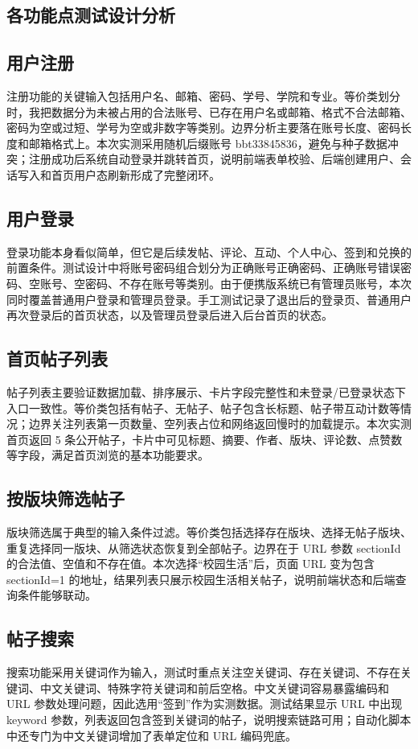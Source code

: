 \documentclass[bwprint]{report}
\begin{document}
\subsection{各功能点测试设计分析}
\subsection{用户注册}
注册功能的关键输入包括用户名、邮箱、密码、学号、学院和专业。等价类划分时，我把数据分为未被占用的合法账号、已存在用户名或邮箱、格式不合法邮箱、密码为空或过短、学号为空或非数字等类别。边界分析主要落在账号长度、密码长度和邮箱格式上。本次实测采用随机后缀账号 bbt33845836，避免与种子数据冲突；注册成功后系统自动登录并跳转首页，说明前端表单校验、后端创建用户、会话写入和首页用户态刷新形成了完整闭环。

\subsection{用户登录}
登录功能本身看似简单，但它是后续发帖、评论、互动、个人中心、签到和兑换的前置条件。测试设计中将账号密码组合划分为正确账号正确密码、正确账号错误密码、空账号、空密码、不存在账号等类别。由于便携版系统已有管理员账号，本次同时覆盖普通用户登录和管理员登录。手工测试记录了退出后的登录页、普通用户再次登录后的首页状态，以及管理员登录后进入后台首页的状态。

\subsection{首页帖子列表}
帖子列表主要验证数据加载、排序展示、卡片字段完整性和未登录/已登录状态下入口一致性。等价类包括有帖子、无帖子、帖子包含长标题、帖子带互动计数等情况；边界关注列表第一页数量、空列表占位和网络返回慢时的加载提示。本次实测首页返回 5 条公开帖子，卡片中可见标题、摘要、作者、版块、评论数、点赞数等字段，满足首页浏览的基本功能要求。

\subsection{按版块筛选帖子}
版块筛选属于典型的输入条件过滤。等价类包括选择存在版块、选择无帖子版块、重复选择同一版块、从筛选状态恢复到全部帖子。边界在于 URL 参数 sectionId 的合法值、空值和不存在值。本次选择“校园生活”后，页面 URL 变为包含 sectionId=1 的地址，结果列表只展示校园生活相关帖子，说明前端状态和后端查询条件能够联动。

\subsection{帖子搜索}
搜索功能采用关键词作为输入，测试时重点关注空关键词、存在关键词、不存在关键词、中文关键词、特殊字符关键词和前后空格。中文关键词容易暴露编码和 URL 参数处理问题，因此选用“签到”作为实测数据。测试结果显示 URL 中出现 keyword 参数，列表返回包含签到关键词的帖子，说明搜索链路可用；自动化脚本中还专门为中文关键词增加了表单定位和 URL 编码兜底。
\end{document}

